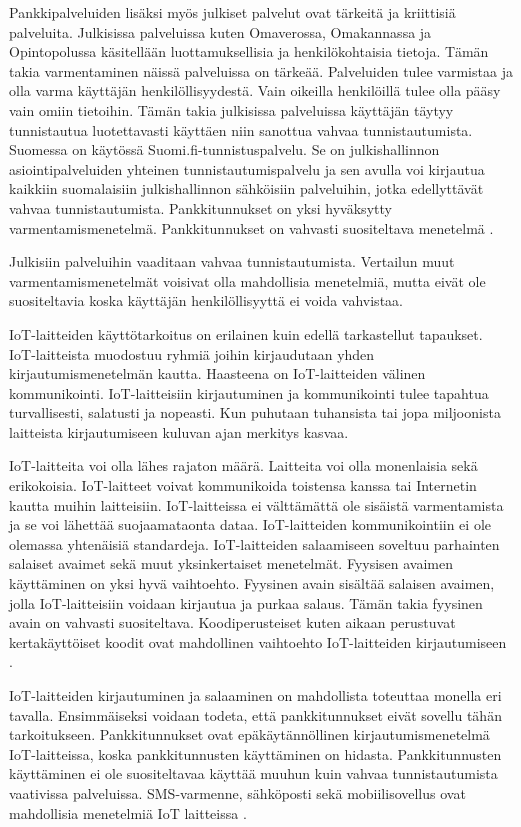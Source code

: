 Pankkipalveluiden lisäksi myös julkiset palvelut ovat tärkeitä ja kriittisiä palveluita. Julkisissa palveluissa kuten Omaverossa, Omakannassa ja Opintopolussa käsitellään luottamuksellisia ja henkilökohtaisia tietoja. Tämän takia varmentaminen näissä palveluissa on tärkeää. Palveluiden tulee varmistaa ja olla varma käyttäjän henkilöllisyydestä. Vain oikeilla henkilöillä tulee olla pääsy vain omiin tietoihin. Tämän takia julkisissa palveluissa käyttäjän täytyy tunnistautua luotettavasti käyttäen niin sanottua vahvaa tunnistautumista. Suomessa on käytössä Suomi.fi-tunnistuspalvelu. Se on julkishallinnon asiointipalveluiden yhteinen tunnistautumispalvelu ja sen avulla voi kirjautua kaikkiin suomalaisiin julkishallinnon sähköisiin palveluihin, jotka edellyttävät vahvaa tunnistautumista. Pankkitunnukset on yksi hyväksytty varmentamismenetelmä. Pankkitunnukset on vahvasti suositeltava menetelmä \citep{suomi.fi}.

Julkisiin palveluihin vaaditaan vahvaa tunnistautumista. Vertailun muut varmentamismenetelmät voisivat olla mahdollisia menetelmiä, mutta eivät ole suositeltavia koska käyttäjän henkilöllisyyttä ei voida vahvistaa.


IoT-laitteiden käyttötarkoitus on erilainen kuin edellä tarkastellut tapaukset. IoT-laitteista muodostuu ryhmiä joihin kirjaudutaan yhden kirjautumismenetelmän kautta. Haasteena on IoT-laitteiden välinen kommunikointi. IoT-laitteisiin kirjautuminen ja kommunikointi tulee tapahtua turvallisesti, salatusti ja nopeasti. Kun puhutaan tuhansista tai jopa miljoonista laitteista kirjautumiseen kuluvan ajan merkitys kasvaa.

IoT-laitteita voi olla lähes rajaton määrä. Laitteita voi olla monenlaisia sekä erikokoisia. IoT-laitteet voivat kommunikoida toistensa kanssa tai Internetin kautta muihin laitteisiin. IoT-laitteissa ei välttämättä ole sisäistä varmentamista ja se voi lähettää suojaamataonta dataa. IoT-laitteiden kommunikointiin ei ole olemassa yhtenäisiä standardeja. IoT-laitteiden salaamiseen soveltuu parhainten salaiset avaimet sekä muut yksinkertaiset menetelmät. Fyysisen avaimen käyttäminen on yksi hyvä vaihtoehto. Fyysinen avain sisältää salaisen avaimen, jolla IoT-laitteisiin voidaan kirjautua ja purkaa salaus. Tämän takia fyysinen avain on vahvasti suositeltava. Koodiperusteiset kuten aikaan perustuvat kertakäyttöiset koodit ovat mahdollinen vaihtoehto IoT-laitteiden kirjautumiseen \citep{el2019survey} \citep{lucia2019device}.

IoT-laitteiden kirjautuminen ja salaaminen on mahdollista toteuttaa monella eri tavalla. Ensimmäiseksi voidaan todeta, että pankkitunnukset eivät sovellu tähän tarkoitukseen. Pankkitunnukset ovat epäkäytännöllinen kirjautumismenetelmä IoT-laitteissa, koska pankkitunnusten käyttäminen on hidasta. Pankkitunnusten käyttäminen ei ole suositeltavaa käyttää muuhun kuin vahvaa tunnistautumista vaativissa palveluissa. SMS-varmenne, sähköposti sekä mobiilisovellus ovat mahdollisia menetelmiä IoT laitteissa \citep{el2019survey} \citep{lucia2019device}.

